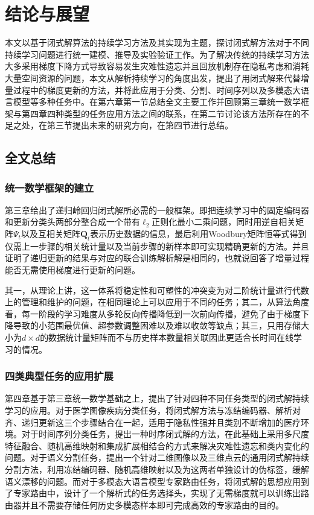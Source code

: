 \chapter{结论与展望}

本文以基于闭式解算法的持续学习方法及其实现为主题，探讨闭式解方法对于不同持续学习问题进行统一建模、推导及实验验证工作。为了解决传统的持续学习方法大多采用梯度下降方式导致容易发生灾难性遗忘并且回放机制存在隐私考虑和消耗大量空间资源的问题，本文从解析持续学习的角度出发，提出了用闭式解来代替增量过程中的梯度更新的方法，并将此应用于分类、分割、时间序列以及多模态大语言模型等多种任务中。在第六章第一节总结全文主要工作并回顾第三章统一数学框架与第四章四种类型的任务应用方法之间的联系，在第二节讨论该方法所存在的不足之处，在第三节提出未来的研究方向，在第四节进行总结。

\section{全文总结}

\subsection{统一数学框架的建立}

第三章给出了递归岭回归闭式解所必需的一般框架。即把连续学习中的固定编码器和更新分类头两部分整合成一个带有$\ell_2$正则化最小二乘问题，同时用逆自相关矩阵$\Psi_t$以及互相关矩阵$\mathbf{Q}_t$表示历史数据的信息，最后利用Woodbury矩阵恒等式得到仅需上一步骤的相关统计量以及当前步骤的新样本即可实现精确更新的方法。并且证明了递归更新的结果与对应的联合训练解析解是相同的，也就说回答了增量过程能否无需使用梯度进行更新的问题。

其一，从理论上讲，这一体系将稳定性和可塑性的冲突变为对二阶统计量进行代数上的管理和维护的问题，在相同理论上可以应用于不同的任务；其二，从算法角度看，每一阶段的学习难度从多轮反向传播降低到一次前向传播，避免了由于梯度下降导致的小范围最优值、超参数调整困难以及难以收敛等缺点；其三，只用存储大小为$d\times d$的数据统计量矩阵而不与历史样本数量相关联因此更适合长时间在线学习的情况。

\subsection{四类典型任务的应用扩展}

第四章基于第三章统一数学基础之上，提出了针对四种不同任务类型的闭式解持续学习的应用。对于医学图像疾病分类任务，将闭式解方法与冻结编码器、解析对齐、递归更新这三个步骤结合在一起，适用于隐私性强并且类别不断增加的医疗环境。对于时间序列分类任务，提出一种时序闭式解的方法，在此基础上采用多尺度特征融合、随机高维映射和集成扩展相结合的方式来解决灾难性遗忘和类内变化的问题。对于语义分割任务，提出一个针对二维图像以及三维点云的通用闭式解持续分割方法，利用冻结编码器、随机高维映射以及为这两者单独设计的伪标签，缓解语义漂移的问题。而对于多模态大语言模型专家路由任务，将闭式解的思想应用到了专家路由中，设计了一个解析式的任务选择头，实现了无需梯度就可以训练出路由器并且不需要存储任何历史多模态样本即可完成高效的专家路由的目的。


